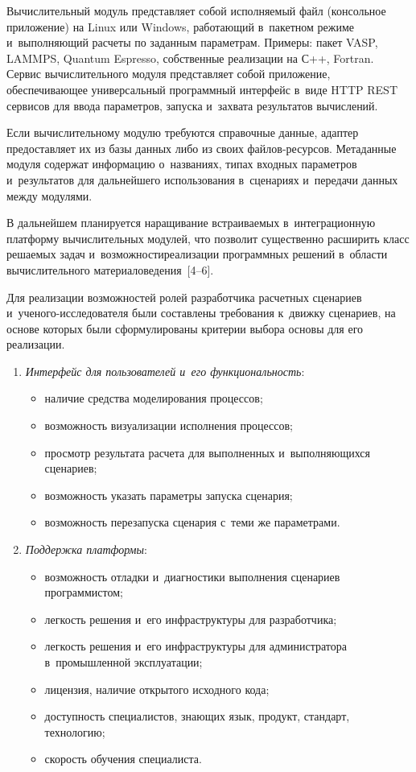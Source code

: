 \begin{multicols}{2}
Вычислительный модуль пред\-став\-ля\-ет собой исполняемый файл (консольное 
приложение) на Linux или Windows, работающий в~пакетном режиме 
и~выполняющий расчеты по заданным па\-ра\-мет\-рам. Примеры: пакет VASP, 
LAMMPS, Quantum Espresso, собственные реализации на С++, Fortran. Сервис 
вычислительного модуля пред\-став\-ля\-ет собой приложение, обеспечивающее 
универсальный программный интерфейс в~виде HTTP REST сервисов для ввода 
параметров, запуска и~захвата результатов вычислений.

       Если вычислительному модулю требуются справочные данные, адаптер 
предоставляет их из базы данных либо из своих фай\-лов-ре\-сур\-сов. 
Метаданные модуля содержат информацию о~названиях, типах входных 
параметров и~результатов для дальнейшего использования в~сценариях и~передачи 
данных между модулями.
       
       В дальнейшем планируется наращивание встраиваемых 
в~интеграционную платформу вычислительных модулей, что позволит 
существенно расширить класс решаемых задач и~воз\-мож\-ности\linebreak реализации 
программных решений в~об\-ласти вы\-чис\-ли\-тель\-но\-го материаловедения~[4--6].
       
    Для реализации возможностей ролей разработчика расчетных сценариев 
и~уче\-но\-го-ис\-сле\-до\-ва\-те\-ля были составлены требования к~движку 
сценариев, на основе которых были сформулированы критерии выбора основы 
для его реализации.
\begin{enumerate}[1.]
\item \textit{Интерфейс для пользователей и~его функциональность}:
\begin{itemize}
\item наличие средства моделирования процессов;
\item возможность визуализации исполнения процессов;
\item просмотр результата расчета для выполненных и~вы\-пол\-ня\-ющих\-ся 
сценариев;
\item возможность указать па\-ра\-мет\-ры запуска сценария;
\item возможность перезапуска сценария с~теми же параметрами.
\end{itemize}
\item \textit{Поддержка платформы}:
\begin{itemize}
\item возможность отладки и~диагностики выполнения сценариев 
программистом;
\item легкость решения и~его инфраструктуры для разработчика; 
\item легкость решения и~его инфраструктуры для администратора 
в~промышленной эксплуатации;
\item лицензия, наличие открытого исходного \mbox{кода};
\item доступность специалистов, знающих язык, продукт, стандарт, 
технологию;
\item скорость обучения специалиста.
\end{itemize}


\end{enumerate}
\end{multicols}
